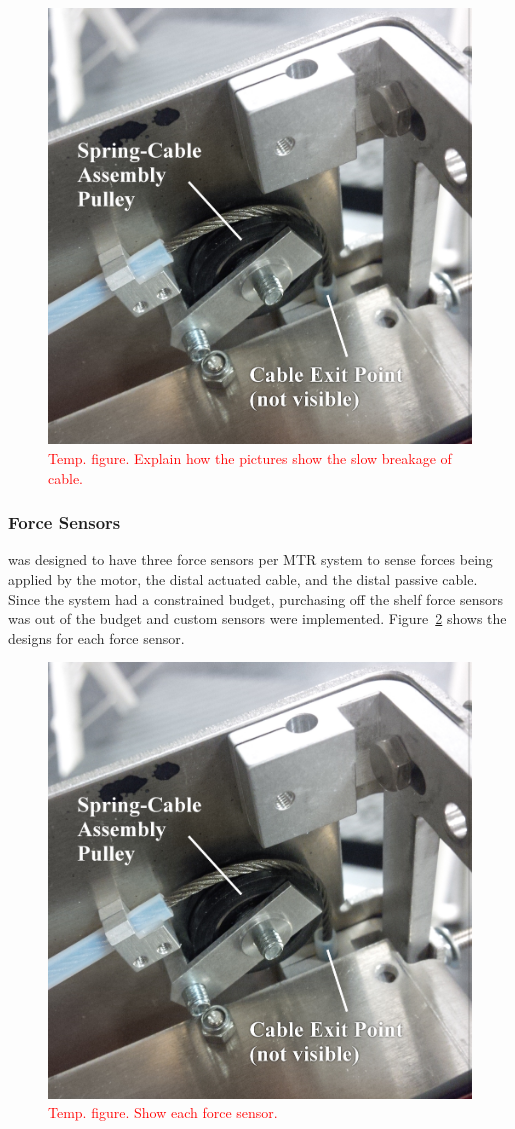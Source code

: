\begin{figure}[thpb]
      \centering
      \includegraphics[width=0.6\columnwidth]{tex/img/cable_pulley_bearing_labelled_fixedfonts}
      \caption{\textcolor{red}{Temp. figure. Explain how the pictures show the slow breakage of cable.}}
      \label{fig:cable_break}
\end{figure}

\subsubsection{Force Sensors}
\label{force_sensing_failure}
\SB{} was designed to have three force sensors per MTR system to sense forces being applied by the motor, the distal actuated cable, and the distal passive cable.
Since the system had a constrained budget, purchasing off the shelf force sensors was out of the budget and custom sensors were implemented.
Figure~\ref{fig:force_sensors} shows the designs for each force sensor.

\begin{figure}[thpb]
      \centering
      \includegraphics[width=0.6\columnwidth]{tex/img/cable_pulley_bearing_labelled_fixedfonts}
      \caption{\textcolor{red}{Temp. figure. Show each force sensor.}}
      \label{fig:force_sensors}
\end{figure}


